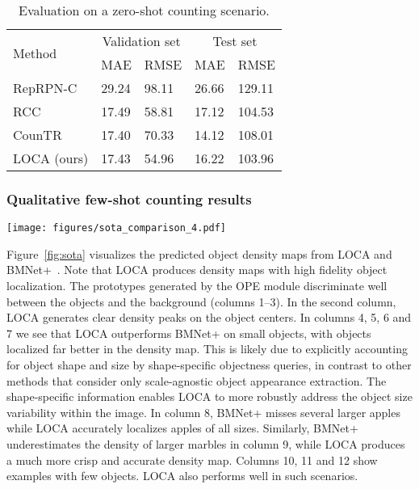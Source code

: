 \documentclass[10pt,twocolumn,letterpaper]{article}
\newcommand*\circledd[1]{\tikz[baseline=(char.base)]{
            \node[shape=circle,draw,inner sep=0.15pt] (char) {#1};}}
\newcommand{\first}[1]{{#1\raisebox{0.8pt}{\footnotesize \color{gold} \circledd{1}}}}
\newcommand{\second}[1]{{#1\raisebox{0.8pt}{\footnotesize \color{silver} \circledd{2}}}}
\newcommand{\third}[1]{{#1\raisebox{0.8pt}{\footnotesize \color{bronze} \circledd{3}}}}
\begin{document}
\begin{table}[htbp]
    \centering
    \begin{tabular}{l l l l l}\toprule
        \multirow{2}{*}{Method}& \multicolumn{2}{c}{Validation set} & \multicolumn{2}{c}{Test set} \\
        & MAE & RMSE & MAE & RMSE \\ 
        \midrule
        RepRPN-C \cite{reprpn} & 29.24 & 98.11 & 26.66 & 129.11 \\
        RCC \cite{hobley} & \third{17.49} & \second{58.81} & \third{17.12} & \second{104.53} \\
        CounTR \cite{countr} & \first{17.40} & \third{70.33} & \first{14.12} & \third{108.01} \\
LOCA (ours) & \second{17.43} & \first{54.96} & \second{16.22} & \first{103.96} \\
        \bottomrule
    \end{tabular}
    \caption{Evaluation on a zero-shot counting scenario.}
    \label{tab:results_zs}
\end{table}

\subsubsection{Qualitative few-shot counting results}

\begin{figure*}
    \centering
    \texttt{[image: figures/sota\_comparison\_4.pdf]}
    \caption{Qualitative results on the FSC147 dataset. Compared to related works, LOCA better discriminates between objects and background, predicts density maps with clear object locations and works well on smaller objects, while better capturing the intra-class variability and within-image size variability.}
    \label{fig:sota}
\end{figure*}





Figure~\ref{fig:sota} visualizes the predicted object density maps from LOCA and BMNet+~\cite{bmnet}. Note that LOCA produces density maps with high fidelity object localization. The prototypes generated by the OPE module discriminate well between the objects and the background (columns 1--3). In the second column, LOCA generates clear density peaks on the object centers. In columns 4, 5, 6 and 7 we see that LOCA outperforms BMNet+ on small objects, with objects localized far better in the density map. This is likely due to explicitly accounting for object shape and size by shape-specific objectness queries, in contrast to other methods that consider only scale-agnostic object appearance extraction.
The shape-specific information enables LOCA to more robustly address the object size variability within the image. In column 8, BMNet+ misses several larger apples while LOCA accurately localizes apples of all sizes. Similarly, BMNet+ underestimates the density of larger marbles in column 9, while LOCA produces a much more crisp and accurate density map. Columns 10, 11 and 12 show examples with few objects. LOCA also performs well in such scenarios.
\end{document}
